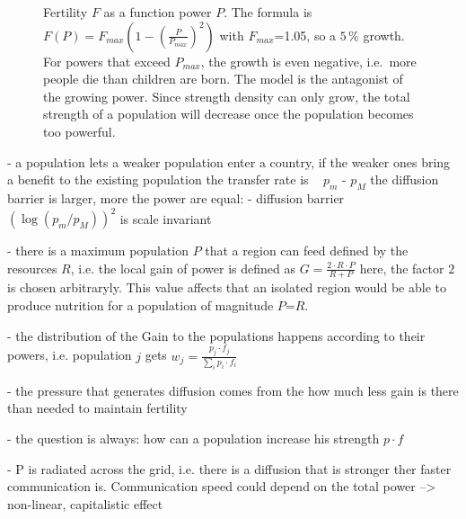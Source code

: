 \documentclass[12pt]{article}
\begin{document}
\begin{figure} [ht]
  \centering
{}
  \label{fig:harvest_function}
  \caption{Fertility $F$ as a function power $P$. The formula is $ F(P) = F_{max} \left( 1 - \left(\frac{P}{P_{max}} \right)^2 \right) $
  with $F_{max}$=1.05, so a $5\,\%$ growth. For powers that exceed $P_{max}$, the growth is even negative, i.e.~more people die than children are born.
  The model is the antagonist of the growing power. Since strength density can only grow, the total strength of a population will decrease once
  the population becomes too powerful.
  } 
\end{figure}  
    
    
 - a population lets a weaker population enter a country, if 
    the weaker ones bring a benefit to the existing population
    the transfer rate is ~ $p_m$ - $p_M$
   the diffusion barrier is larger, more the power are equal:
 - diffusion barrier ~ $(\log(p_m/p_M))^2$ is scale invariant

 - there is a maximum population $P$ that a region can feed 
defined by the resources $R$, i.e. the local gain of power
is defined as $G = \frac{2 \cdot R \cdot P}{R + P}$
here, the factor $2$ is chosen arbitraryly. This value affects that
an isolated region would be able to produce nutrition for a population
of magnitude $P$=$R$.

 - the distribution of the Gain to the populations happens according
   to their powers, i.e.
   population $j$ gets $w_j = \frac{ p_j \cdot f_j }{ \sum_i p_i \cdot f_i }$

- the pressure that generates diffusion comes from the how much less
  gain is there than needed to maintain fertility

- the question is always: how can a population increase his strength $p \cdot f$

- P is radiated across the grid, i.e. there is a diffusion that is
  stronger ther faster communication is. Communication speed could
  depend on the total power --> non-linear, capitalistic effect
\end{document}
